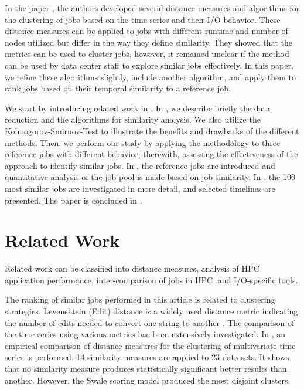 \documentclass{jhps}
\begin{document}
In the paper \cite{Eugen20HPS}, the authors developed several distance measures and algorithms for the clustering of jobs based on the time series and their I/O behavior.
These distance measures can be applied to jobs with different runtime and number of nodes utilized but differ in the way they define similarity.
They showed that the metrics can be used to cluster jobs, however, it remained unclear if the method can be used by data center staff to explore similar jobs effectively.
In this paper, we refine these algorithms slightly, include another algorithm, and apply them to rank jobs based on their temporal similarity to a reference job.

We start by introducing related work in .
In , we describe briefly the data reduction and the algorithms for similarity analysis.
We also utilize the Kolmogorov-Smirnov-Test to illustrate the benefits and drawbacks of the different methods.
Then, we perform our study by applying the methodology to three reference jobs with different behavior, therewith, assessing the effectiveness of the approach to identify similar jobs.
In , the reference jobs are introduced and quantitative analysis of the job pool is made based on job similarity.
In , the 100 most similar jobs are investigated in more detail, and selected timelines are presented.
The paper is concluded in .

\section{Related Work}
\label{sec:relwork}

Related work can be classified into distance measures, analysis of HPC application performance, inter-comparison of jobs in HPC, and I/O-specific tools.

The ranking of similar jobs performed in this article is related to clustering strategies.
Levenshtein (Edit) distance is a widely used distance metric indicating the number of edits needed to convert one string to another \cite{navarro2001guided}.
The comparison of the time series using various metrics has been extensively investigated.
In \cite{khotanlou2018empirical}, an empirical comparison of distance measures for the clustering of multivariate time series is performed.
14 similarity measures are applied to 23 data sets.
It shows that no similarity measure produces statistically significant better results than another.
However, the Swale scoring model \cite{morse2007efficient} produced the most disjoint clusters.
\end{document}
